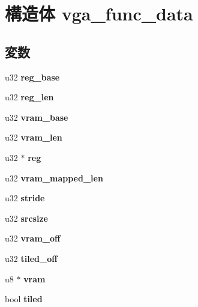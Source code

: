 \section{構造体 vga\-\_\-func\-\_\-data}
\label{structvga__func__data}
\subsection*{変数}
\begin{DoxyCompactItemize}
\item 
u32 {\bfseries reg\-\_\-base}\label{structvga__func__data_a0febb150c9e33c3d3d499d16f2c25aa2}

\item 
u32 {\bfseries reg\-\_\-len}\label{structvga__func__data_ad1fa2e8138bd8018a80cc916c521d120}

\item 
u32 {\bfseries vram\-\_\-base}\label{structvga__func__data_a7bf3c6a7824f12bb8d9aaf6a584ed0e6}

\item 
u32 {\bfseries vram\-\_\-len}\label{structvga__func__data_a8589ff2602ba59454489d15660f8856d}

\item 
u32 $\ast$ {\bfseries reg}\label{structvga__func__data_a5b8980041d3aa45da13690d3e87dd6ed}

\item 
u32 {\bfseries vram\-\_\-mapped\-\_\-len}\label{structvga__func__data_ad05a484f45fa3860b4f5db2b153ca726}

\item 
u32 {\bfseries stride}\label{structvga__func__data_ae1b1ebde16b53679229b9ff5848c1d4a}

\item 
u32 {\bfseries srcsize}\label{structvga__func__data_aa53e45766d56256b86a2f6fdfa66e527}

\item 
u32 {\bfseries vram\-\_\-off}\label{structvga__func__data_a1ae4aa2e42f550832b7a527722592c41}

\item 
u32 {\bfseries tiled\-\_\-off}\label{structvga__func__data_ad02f467319387e293b85b17fc5f0f530}

\item 
u8 $\ast$ {\bfseries vram}\label{structvga__func__data_a17e12fcf88e50abfa39d19d2e0e7556d}

\item 
bool {\bfseries tiled}\label{structvga__func__data_ab71a96007b07c910d86cd2d6a4b002ef}


\end{DoxyCompactItemize}
